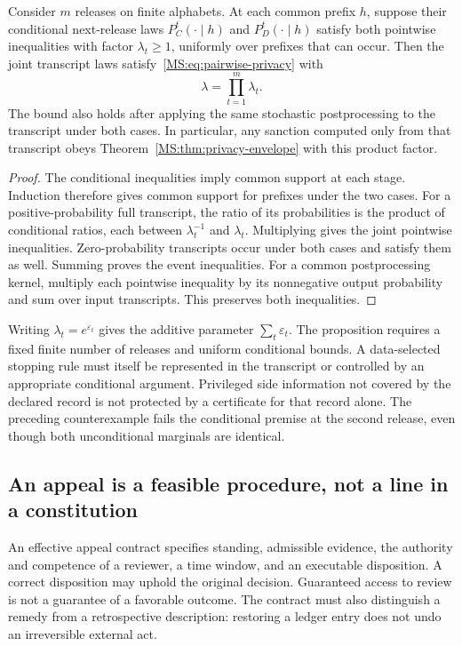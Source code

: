 \begin{MSproposition}\label{MS:prop:privacy-transcript}
Consider $m$ releases on finite alphabets. At each common prefix $h$, suppose their conditional next-release laws $P_C^t(\cdot\mid h)$ and $P_D^t(\cdot\mid h)$ satisfy both pointwise inequalities with factor $\lambda_t\ge1$, uniformly over prefixes that can occur. Then the joint transcript laws satisfy~\eqref{MS:eq:pairwise-privacy} with
\[
\lambda=\prod_{t=1}^{m}\lambda_t.
\]
The bound also holds after applying the same stochastic postprocessing to the transcript under both cases. In particular, any sanction computed only from that transcript obeys Theorem~\ref{MS:thm:privacy-envelope} with this product factor.
\end{MSproposition}
\begin{proof}
The conditional inequalities imply common support at each stage. Induction therefore gives common support for prefixes under the two cases. For a positive-probability full transcript, the ratio of its probabilities is the product of conditional ratios, each between $\lambda_t^{-1}$ and $\lambda_t$. Multiplying gives the joint pointwise inequalities. Zero-probability transcripts occur under both cases and satisfy them as well. Summing proves the event inequalities. For a common postprocessing kernel, multiply each pointwise inequality by its nonnegative output probability and sum over input transcripts. This preserves both inequalities.
\end{proof}

Writing $\lambda_t=e^{\varepsilon_t}$ gives the additive parameter $\sum_t\varepsilon_t$. The proposition requires a fixed finite number of releases and uniform conditional bounds. A data-selected stopping rule must itself be represented in the transcript or controlled by an appropriate conditional argument. Privileged side information not covered by the declared record is not protected by a certificate for that record alone. The preceding counterexample fails the conditional premise at the second release, even though both unconditional marginals are identical.

\subsection{An appeal is a feasible procedure, not a line in a constitution}\label{MS:sec:effective-appeal}

An effective appeal contract specifies standing, admissible evidence, the authority and competence of a reviewer, a time window, and an executable disposition. A correct disposition may uphold the original decision. Guaranteed access to review is not a guarantee of a favorable outcome. The contract must also distinguish a remedy from a retrospective description: restoring a ledger entry does not undo an irreversible external act.

